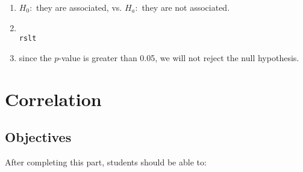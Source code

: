 \documentclass[11pt]{book}\usepackage[]{graphicx}\usepackage[]{color}
\begin{document}
\begin{exercises}
\begin{exercise}
\end{exercise}
\begin{solution} %

\begin{enumerate}

\item $H_0:$ they are associated, vs. $H_a:$ they are not associated. 

\item 

\begin{verbatim}

rslt

\end{verbatim}

\item since the $p$-value is greater than 0.05, we will not reject the null hypothesis.
\end{enumerate}

\end{solution}



\end{exercises}

\onecolumn



\chapter{Correlation}
\label{chap:ch15}

\section{Objectives}

After completing this part, students should be able to:

\end{document}
